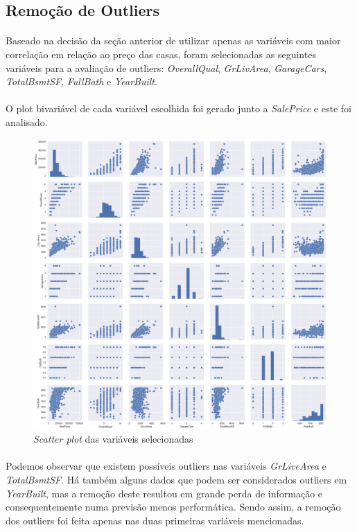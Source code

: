 \documentclass{article}
\begin{document}
		\subsection{Remoção de Outliers}
			\paragraph{}Baseado na decisão da seção anterior de utilizar apenas as variáveis com maior correlação em relação ao preço das casas, foram selecionadas as seguintes variáveis para a avaliação de outliers: \textit{OverallQual}, \textit{GrLivArea}, \textit{GarageCars}, \textit{TotalBsmtSF}, \textit{FullBath} e \textit{YearBuilt}.
			
			\paragraph{}O plot bivariável de cada variável escolhida foi gerado junto a \textit{SalePrice} e este foi analisado.
		
			\begin{figure}[H]
				\centering
				\includegraphics[scale=0.35]{../img/scatter}
				\caption{\textit{Scatter plot} das variáveis selecionadas}
			\end{figure}
		
			\paragraph{}Podemos observar que existem possíveis outliers nas variáveis \textit{GrLiveArea} e \textit{TotalBsmtSF}. Há também alguns dados que podem ser considerados outliers em \textit{YearBuilt}, mas a remoção deste resultou em grande perda de informação e consequentemente numa previsão menos performática. Sendo assim, a remoção dos outliers foi feita apenas nas duas primeiras variáveis mencionadas.
		
\end{document}

